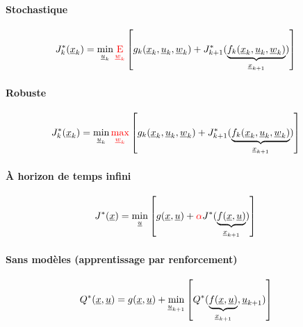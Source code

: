 \paragraph{Stochastique}

\begin{align}
J^*_k(\col{x}_k) = 
\operatornamewithlimits{min}\limits_{\col{u}_k}
{\color{red}
\operatornamewithlimits{E}\limits_{\col{w}_k}
}
&\left[
g_k(\col{x}_k , \col{u}_k , \col{w}_k ) + J^*_{k+1}( 
\underbrace{
f_k(\col{x}_k , \col{u}_k , \col{w}_k ) 
}_{\col{x}_{k+1}}
)
\right] 
\end{align} 

\paragraph{Robuste}

\begin{align}
J^*_k(\col{x}_k) = 
\operatornamewithlimits{min}\limits_{\col{u}_k}
{\color{red}
\operatornamewithlimits{max}\limits_{\col{w}_k}
}
&\left[
g_k(\col{x}_k , \col{u}_k , \col{w}_k ) + J^*_{k+1}( 
\underbrace{
f_k(\col{x}_k , \col{u}_k , \col{w}_k ) 
}_{\col{x}_{k+1}}
)
\right] 
\end{align} 

\paragraph{À horizon de temps infini}

\begin{align}
J^*(\col{x}) = 
\operatornamewithlimits{min}\limits_{\col{u}}
&\left[
g(\col{x} , \col{u} ) + {\color{red}\alpha} J^*( 
\underbrace{
f(\col{x} , \col{u} ) 
}_{\col{x}_{k+1}}
)
\right] 
\end{align} 

\paragraph{Sans modèles (apprentissage par renforcement)}

\begin{align}
Q^*(\col{x}, \col{u} ) = g(\col{x} , \col{u} ) + 
\operatornamewithlimits{min}\limits_{\col{u}_{k+1}}
&\left[
Q^*( 
\underbrace{
f(\col{x} , \col{u} ) 
}_{\col{x}_{k+1}}
, \col{u}_{k+1}
)
\right] 
\end{align} 

